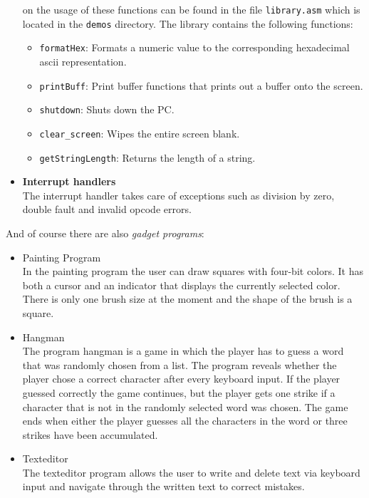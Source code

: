 \begin{itemize}
on the usage of these functions can be found in the file \texttt{library.asm} which is located
in the \texttt{demos} directory. The library contains the following functions: 
\begin{itemize}
\item \texttt{formatHex}: Formats a numeric value to the corresponding hexadecimal ascii representation.
\item \texttt{printBuff}: Print buffer functions that prints out a buffer onto the screen. 
\item \texttt{shutdown}: Shuts down the PC. 
\item \texttt{clear\_screen}: Wipes the entire screen blank.
\item \texttt{getStringLength}: Returns the length of a string.
\end{itemize}

\item \textbf{Interrupt handlers} \\
The interrupt handler takes care of exceptions such as division by zero, double fault
and invalid opcode errors.


\end{itemize}

And of course there are also \textit{gadget programs}:

\begin{itemize}

\item Painting Program \\
In the painting program the user can draw squares with four-bit colors. It has both a cursor and an indicator 
that displays the currently selected color. There is only one brush size at the moment and the
shape of the brush is a square.

\item Hangman \\
The program hangman is a game in which the player has to guess a word that was randomly chosen from a list. The program 
reveals whether the player chose a correct character after every keyboard input. If the player guessed correctly
the game continues, but the player gets one strike if a character that is not in the randomly selected word 
was chosen. The game ends when either the player guesses all the characters in the word or three strikes have
been accumulated.

\item Texteditor \\
The texteditor program allows the user to write and delete text via keyboard input and navigate through the written 
text to correct mistakes.

\end{itemize}



